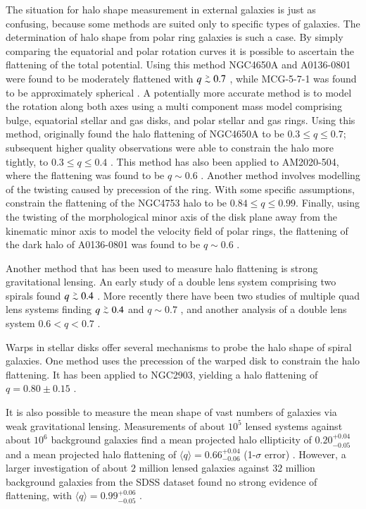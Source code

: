 \documentclass[traditabstract]{aa} %
\newcommand\gesim{\lower.5ex\hbox{$\; \buildrel > \over \sim \;$}}
\begin{document}
The situation for halo shape measurement in external galaxies is just
as confusing, because some methods are suited only to specific types of
galaxies. The determination of halo shape from polar ring galaxies is
such a case. By simply comparing the
equatorial and polar rotation curves it is possible to ascertain the
flattening of the total potential. Using
this method NGC4650A and A0136-0801 were found to be moderately
flattened with $q \gesim 0.7$
\citep[][respectively]{wmes1987,swr1983}, while MCG-5-7-1 was found to
be approximately spherical \citep{wmes1987}. 
A potentially more accurate method is to model the rotation along both
axes using a multi component mass model comprising bulge, equatorial
stellar and gas disks, and polar stellar and gas rings. Using this
method, \citet{ss1990} originally found the halo flattening of
NGC4650A to be $0.3 \leq q \leq 0.7$; subsequent higher quality
observations were able to constrain the halo more tightly, to $0.3
\leq q \leq 0.4$ \citep{srjf1994}. This method has also been
applied to AM2020-504, where the flattening was found to be
$q \sim 0.6$ \citep{acchs1993}.
Another method involves modelling of the twisting caused by precession 
of the ring. With some specific assumptions, 
\citet{sckd1992} constrain the flattening of the NGC4753 halo to be
$0.84 \leq q \leq 0.99$.
Finally, using the twisting
of the morphological minor axis of the disk plane away
from the kinematic minor axis to model the velocity field of polar
rings, the flattening of the dark halo of A0136-0801 was found to be
$q \sim 0.6$ \citep{sp1995}.


Another method that has been used to measure halo flattening is strong
gravitational lensing. An early study of a double lens system
comprising two spirals found $q \gesim 0.4$ \citep{kdbj1998}. More
recently there have been two studies of multiple quad lens systems
finding $q \gesim 0.4$ \citep{rt2001} and $q \sim 0.7$ \citep{ck2004},
and another analysis of a double lens system $0.6 < q < 0.7$
\citep{chaeetal2002}.


Warps in stellar disks \citep[e.g.][]{rc1998} 
offer several mechanisms to probe the halo
shape of spiral galaxies. One method uses 
the precession of the warped disk to
constrain the halo flattening. It has been
applied to NGC2903, yielding a halo flattening of $q =
0.80 \pm 0.15$ \citep{hs1994}.

It is also possible to measure the mean shape of vast numbers of
galaxies via weak gravitational lensing. 
Measurements of about $10^5$ lensed systems against about $10^6$ background
galaxies  \citep{hyg2004a} find a
mean projected halo ellipticity of $0.20^{+0.04}_{-0.05}$ and a mean
projected halo flattening of $\langle q \rangle =
0.66_{-0.06}^{+0.04}$ (1-$\sigma$ error) .  However, a larger
investigation of about $2$ million lensed galaxies  against 
$32$ million background galaxies from the SDSS dataset found no strong
evidence of flattening, with $\langle q \rangle = 0.99_{-0.05}^{+0.06}$
\citep{mhbsb2005}.
\end{document}
